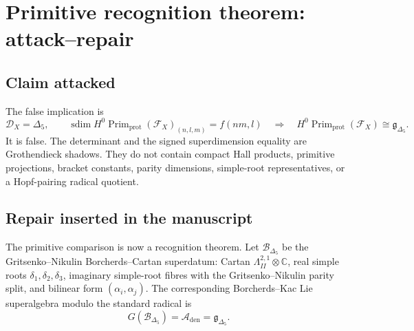 \section{Primitive recognition theorem: attack--repair}
\label{sec:primitive-recognition-attack-repair}

\providecommand{\Z}{\mathbb Z}
\providecommand{\C}{\mathbb C}
\providecommand{\La}{\Lambda}
\providecommand{\Prim}{\operatorname{Prim}}
\providecommand{\sdim}{\operatorname{sdim}}
\providecommand{\smult}{\operatorname{smult}}
\providecommand{\autcor}{\mathfrak g_{\Delta_5}}

\subsection{Claim attacked}

The false implication is
\[
\mathcal D_X=\Delta_5,\qquad
\sdim H^0\Prim_{\mathrm{prot}}(\mathcal F_X)_{(n,l,m)}=f(nm,l)
\quad\Longrightarrow\quad
H^0\Prim_{\mathrm{prot}}(\mathcal F_X)\cong\autcor .
\]
It is false.  The determinant and the signed superdimension equality are
Grothendieck shadows.  They do not contain compact Hall products,
primitive projections, bracket constants, parity dimensions, simple-root
representatives, or a Hopf-pairing radical quotient.

\subsection{Repair inserted in the manuscript}

The primitive comparison is now a recognition theorem.  Let
\(\mathscr B_{\Delta_5}\) be the Gritsenko--Nikulin Borcherds--Cartan
superdatum: Cartan \(\La^{2,1}_{II}\otimes\C\), real simple roots
\(\delta_1,\delta_2,\delta_3\), imaginary simple-root fibres with the
Gritsenko--Nikulin parity split, and bilinear form
\((\alpha_i,\alpha_j)\).  The corresponding Borcherds--Kac Lie
superalgebra modulo the standard radical is
\[
G(\mathscr B_{\Delta_5})=\mathcal A_{\mathrm{den}}=\autcor .
\]

